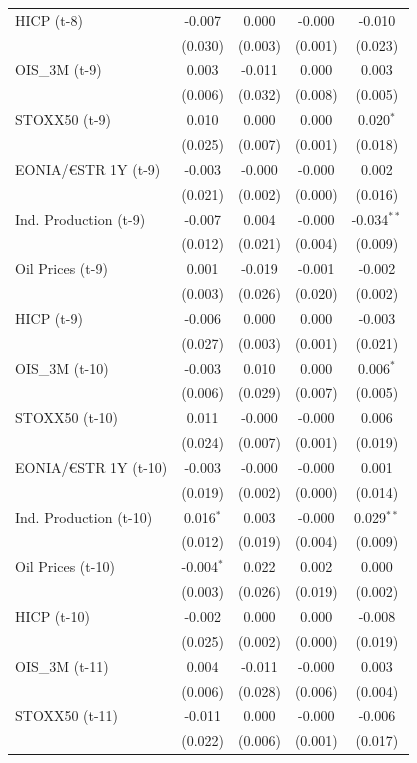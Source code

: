 \begin{longtable}[t]{lcccc}
HICP (t-8) & -0.007 & 0.000 & -0.000 & -0.010\\
 & (0.030) & (0.003) & (0.001) & (0.023)\\
OIS\_3M (t-9) & 0.003 & -0.011 & 0.000 & 0.003\\
 & (0.006) & (0.032) & (0.008) & (0.005)\\
STOXX50 (t-9) & 0.010 & 0.000 & 0.000 & 0.020$^{*}$\\
 & (0.025) & (0.007) & (0.001) & (0.018)\\
EONIA/€STR 1Y (t-9) & -0.003 & -0.000 & -0.000 & 0.002\\
 & (0.021) & (0.002) & (0.000) & (0.016)\\
Ind. Production (t-9) & -0.007 & 0.004 & -0.000 & -0.034$^{**}$\\
 & (0.012) & (0.021) & (0.004) & (0.009)\\
Oil Prices (t-9) & 0.001 & -0.019 & -0.001 & -0.002\\
 & (0.003) & (0.026) & (0.020) & (0.002)\\
HICP (t-9) & -0.006 & 0.000 & 0.000 & -0.003\\
 & (0.027) & (0.003) & (0.001) & (0.021)\\
OIS\_3M (t-10) & -0.003 & 0.010 & 0.000 & 0.006$^{*}$\\
 & (0.006) & (0.029) & (0.007) & (0.005)\\
STOXX50 (t-10) & 0.011 & -0.000 & -0.000 & 0.006\\
 & (0.024) & (0.007) & (0.001) & (0.019)\\
EONIA/€STR 1Y (t-10) & -0.003 & -0.000 & -0.000 & 0.001\\
 & (0.019) & (0.002) & (0.000) & (0.014)\\
Ind. Production (t-10) & 0.016$^{*}$ & 0.003 & -0.000 & 0.029$^{**}$\\
 & (0.012) & (0.019) & (0.004) & (0.009)\\
Oil Prices (t-10) & -0.004$^{*}$ & 0.022 & 0.002 & 0.000\\
 & (0.003) & (0.026) & (0.019) & (0.002)\\
HICP (t-10) & -0.002 & 0.000 & 0.000 & -0.008\\
 & (0.025) & (0.002) & (0.000) & (0.019)\\
OIS\_3M (t-11) & 0.004 & -0.011 & -0.000 & 0.003\\
 & (0.006) & (0.028) & (0.006) & (0.004)\\
STOXX50 (t-11) & -0.011 & 0.000 & -0.000 & -0.006\\
 & (0.022) & (0.006) & (0.001) & \vphantom{1} (0.017)\\

\end{longtable}
